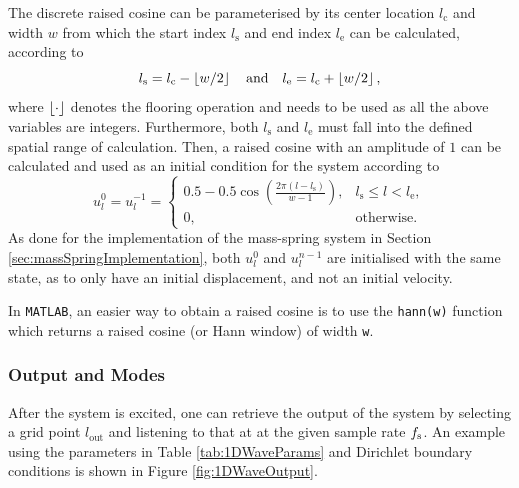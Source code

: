 The discrete raised cosine can be parameterised by its center location $l_\text{c}$ and width $w$ from which the start index $l_\text{s}$ and end index $l_\text{e}$ can be calculated, according to 
\begin{equation}
    l_\text{s} = l_\text{c} - \floor[w/2]\qaq l_\text{e} = l_\text{c} + \floor[w/2],
\end{equation}
where $\floor[\cdot]$ denotes the flooring operation and needs to be used as all the above variables are integers. Furthermore, both $l_\text{s}$ and $l_\text{e}$ must fall into the defined spatial range of calculation. Then, a raised cosine with an amplitude of $1$ can be calculated and used as an initial condition for the system according to
\begin{equation}\label{eq:raisedCos}
    u_l^0 = u_l^{-1} =
    \begin{cases}
        0.5 - 0.5\cos\left(\frac{2\pi (l - l_\text{s})}{w - 1}\right), & l_\text{s} \leq l < l_\text{e},\\
        0, & \text{otherwise}.
    \end{cases}
\end{equation}
As done for the implementation of the mass-spring system in Section \ref{sec:massSpringImplementation}, both $u_l^0$ and $u_l^{n-1}$ are initialised with the same state, as to only have an initial displacement, and not an initial velocity. 

In \texttt{MATLAB}, an easier way to obtain a raised cosine is to use the \texttt{hann(w)} function which returns a raised cosine (or Hann window) of width \texttt{w}.

\subsubsection{Output and Modes}
After the system is excited, one can retrieve the output of the system by selecting a grid point $l_\text{out}$ and listening to that at at the given sample rate $f_\text{s}$. An example using the parameters in Table \ref{tab:1DWaveParams} and Dirichlet boundary conditions is shown in Figure \ref{fig:1DWaveOutput}.

